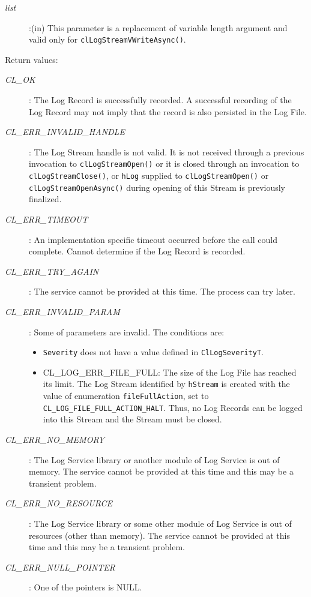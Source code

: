 \begin{flushleft}
\begin{Desc}
\begin{description}
\item[{\em list}]:(in) This parameter is a replacement of variable length argument and valid only for {\tt{clLogStreamVWriteAsync()}}.
\end{description}
\end{Desc}
\begin{Desc}
\item[Return values:]
\begin{description}
\item[{\em CL\_\-OK}]: The Log Record is successfully recorded. A successful recording of the Log Record may not imply that the record is also persisted
in the Log File.
\item[{\em CL\_\-ERR\_\-INVALID\_\-HANDLE}]: 
The Log Stream handle is not valid. It is not received through a previous invocation to 
{\tt{clLogStreamOpen()}} or it is closed through an invocation to {\tt{clLogStreamClose()}}, or {\tt{hLog}} supplied to {\tt{clLogStreamOpen()}} or 
{\tt{clLogStreamOpenAsync()}} during opening of this Stream is previously finalized.
\item[{\em CL\_\-ERR\_\-TIMEOUT}]: An implementation specific timeout occurred before the call could complete. Cannot determine if
the Log Record is recorded.
\item[{\em CL\_\-ERR\_\-TRY\_\-AGAIN}]: The service cannot be provided at this time. The process can try later.
\item[{\em CL\_\-ERR\_\-INVALID\_\-PARAM}]: Some of parameters are invalid. The conditions are:
\begin{itemize}
\item
{\tt{Severity}} does not have a value defined in {\tt{ClLogSeverityT}}.
\item
CL\_\-LOG\_\-ERR\_\-FILE\_\-FULL: The size of the Log File has reached its limit. The Log Stream identified by {\tt{hStream}} is created with 
the value of enumeration {\tt{fileFullAction}}, set to {\tt{CL\_\-LOG\_\-FILE\_\-FULL\_\-ACTION\_\-HALT}}. Thus, no Log Records can be logged into 
this Stream and the Stream must be closed.
\end{itemize}
\item[{\em CL\_\-ERR\_\-NO\_\-MEMORY}]: The Log Service library or another module of Log Service is out of memory. The service cannot 
be provided at this time and this may be a transient problem.
\item[{\em CL\_\-ERR\_\-NO\_\-RESOURCE}]: The Log Service library or some other module of Log Service is out of resources 
(other than memory). The service cannot be provided at this time and this may be a transient problem.
\item[{\em CL\_\-ERR\_\-NULL\_\-POINTER}]: One of the pointers is NULL.


\end{description}
\end{Desc}
\end{flushleft}
